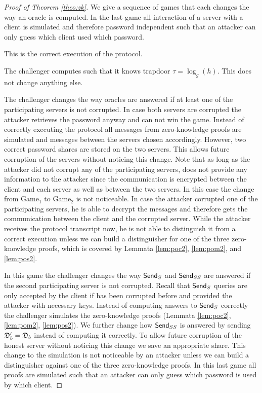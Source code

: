 \begin{proof}[Proof of Theorem \ref{theo:zk}]
We give a sequence of games that each changes the way an oracle is computed.
In the last game all interaction of a server with a client is simulated and therefore password independent such that an attacker can only guess which client used which password.

This is the correct execution of the protocol.

The challenger computes \crs such that it knows trapdoor $\tau=\log_g(h)$.
This does not change anything else.

The challenger changes the way \Execute oracles are answered if at least one of the participating servers is not corrupted.
In case both servers are corrupted the attacker retrieves the password anyway and can not win the game.
Instead of correctly executing the protocol all messages from zero-knowledge proofs are simulated and messages between the servers chosen accordingly.
However, two correct password shares are stored on the two servers.
This allows future corruption of the servers without noticing this change.
Note that as long as the attacker did not corrupt any of the participating servers, \Execute does not provide any information to the attacker since the communication is encrypted between the client and each server as well as between the two servers.
In this case the change from Game$_1$ to Game$_2$ is not noticeable.
In case the attacker corrupted one of the participating servers, he is able to decrypt the messages and therefore gets the communication between the client and the corrupted server.
While the attacker receives the protocol transcript now, he is not able to distinguish it from a correct execution unless we can build a distinguisher for one of the three zero-knowledge proofs, which is covered by Lemmata \ref{lem:poc2}, \ref{lem:pom2}, and \ref{lem:pos2}.

In this game the challenger changes the way $\mathsf{Send}_{S}$ and $\mathsf{Send}_{SS}$ are answered if the second participating server is not corrupted.
Recall that $\mathsf{Send}_S$ queries are only accepted by the client if \Server has been corrupted before and provided the attacker with necessary keys.
Instead of computing answers to $\mathsf{Send}_S$ correctly the challenger simulates the zero-knowledge proofs (Lemmata \ref{lem:poc2}, \ref{lem:pom2}, \ref{lem:pos2}).
We further change how $\mathsf{Send}_{SS}$ is answered by sending $\mathfrak{D}'_b=\mathfrak{D}_b$ instead of computing it correctly.
To allow future corruption of the honest server without noticing this change we save an appropriate share.
This change to the simulation is not noticeable by an attacker unless we can build a distinguisher against one of the three zero-knowledge proofs.
In this last game all proofs are simulated such that an attacker can only guess which password is used by which client.
\end{proof}


